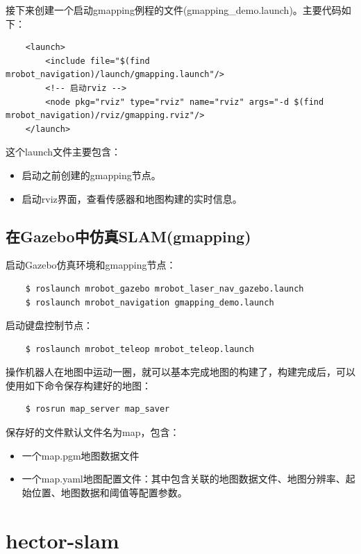 \documentclass[9pt, oneside]{book}
\begin{document}
接下来创建一个启动gmapping例程的文件(gmapping\_demo.launch)。主要代码如下：

\begin{verbatim}
    <launch>
        <include file="$(find mrobot_navigation)/launch/gmapping.launch"/>
        <!-- 启动rviz -->
        <node pkg="rviz" type="rviz" name="rviz" args="-d $(find mrobot_navigation)/rviz/gmapping.rviz"/>
    </launch>
\end{verbatim}

这个launch文件主要包含：

\begin{itemize}
    \item 启动之前创建的gmapping节点。
    \item 启动rviz界面，查看传感器和地图构建的实时信息。
\end{itemize}

\subsection{在Gazebo中仿真SLAM(gmapping)}

启动Gazebo仿真环境和gmapping节点：

\begin{verbatim}
    $ roslaunch mrobot_gazebo mrobot_laser_nav_gazebo.launch
    $ roslaunch mrobot_navigation gmapping_demo.launch
\end{verbatim}

启动键盘控制节点：

\begin{verbatim}
    $ roslaunch mrobot_teleop mrobot_teleop.launch
\end{verbatim}

操作机器人在地图中运动一圈，就可以基本完成地图的构建了，构建完成后，可以使用如下命令保存构建好的地图：

\begin{verbatim}
    $ rosrun map_server map_saver
\end{verbatim}

保存好的文件默认文件名为map，包含：
\begin{itemize}
    \item 一个map.pgm地图数据文件
    \item 一个map.yaml地图配置文件：其中包含关联的地图数据文件、地图分辨率、起始位置、地图数据和阈值等配置参数。
\end{itemize}

\section{hector-slam}
\end{document}
